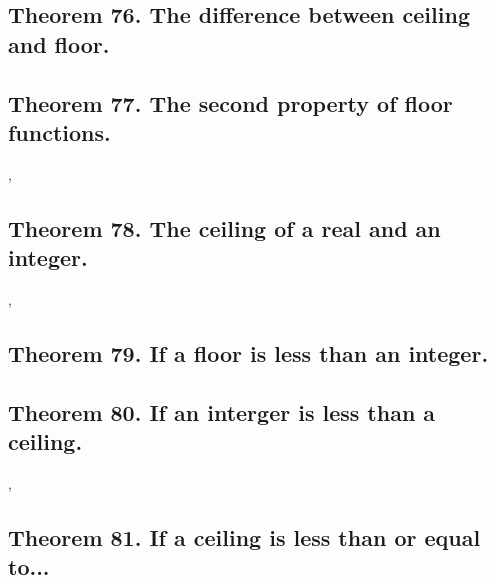 \documentclass[preview]{standalone}
\begin{document}
\subsection[The difference between a ceiling and a floor.]
    {
        \color{section}Theorem 76. \color{black} The difference between ceiling and floor.
    }

\pagebreak


\subsection[The second property of floor functions.]
    {
        \color{section}Theorem 77. \color{black} The second property of floor functions.
    }

\sep
\pagebreak


\subsection[The ceiling of a real number and an integer.]
    {
        \color{section}Theorem 78. \color{black} The ceiling of a real and an integer.
    }

\sep


\subsection[If a floor is less than an integer.]
    {
        \color{section}Theorem 79. \color{black} If a floor is less than an integer.
    }

\pagebreak


\subsection[If an interger is less than a ceiling.]
    {
        \color{section}Theorem 80. \color{black} If an interger is less than a ceiling.
    }

\sep


\subsection[If a ceiling is less than or equal to...]
    {
        \color{section}Theorem 81. \color{black} If a ceiling is less than or equal to...
    }

\pagebreak
\end{document}
